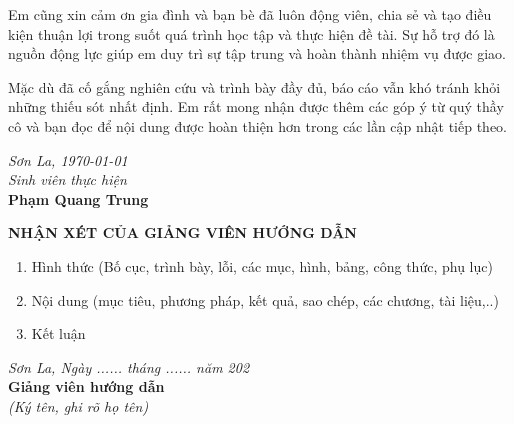 \documentclass[12pt]{article}
\begin{document}
	Em cũng xin cảm ơn gia đình và bạn bè đã luôn động viên, chia sẻ và tạo điều kiện thuận lợi trong suốt quá trình học tập và thực hiện đề tài. Sự hỗ trợ đó là nguồn động lực giúp em duy trì sự tập trung và hoàn thành nhiệm vụ được giao.
	
	Mặc dù đã cố gắng nghiên cứu và trình bày đầy đủ, báo cáo vẫn khó tránh khỏi những thiếu sót nhất định. Em rất mong nhận được thêm các góp ý từ quý thầy cô và bạn đọc để nội dung được hoàn thiện hơn trong các lần cập nhật tiếp theo.
	
	\vspace{30pt}
	
	\begin{flushright}
		\textit{Sơn La, \today}\\[10pt]
		\textit{Sinh viên thực hiện}\\[30pt]
		\textbf{Phạm Quang Trung}
	\end{flushright}
	
	\newpage
	
	\newpage
	\begin{center}
		\textbf{NHẬN XÉT CỦA GIẢNG VIÊN HƯỚNG DẪN}
	\end{center}
	
	\vspace{1cm}
	
	\begin{enumerate}
		\item Hình thức (Bố cục, trình bày, lỗi, các mục, hình, bảng, công thức, phụ lục)
		
		\vspace{3cm}
		
		\item Nội dung (mục tiêu, phương pháp, kết quả, sao chép, các chương, tài liệu,..)
		
		\vspace{3cm}
		
		\item Kết luận
		
		\vspace{3cm}
	\end{enumerate}
	
	\vspace{1cm}
	
	\begin{flushright}
		\textit{Sơn La, Ngày ...... tháng ...... năm 202}\\[0.5cm]
		\textbf{Giảng viên hướng dẫn}\\[0.3cm]
		\textit{(Ký tên, ghi rõ họ tên)}
	\end{flushright}
	
\end{document}

